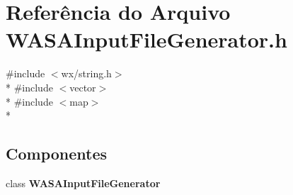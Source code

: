 \section{Referência do Arquivo W\+A\+S\+A\+Input\+File\+Generator.\+h}
\label{_w_a_s_a_input_file_generator_8h}
{\ttfamily \#include $<$wx/string.\+h$>$}\\*
{\ttfamily \#include $<$vector$>$}\\*
{\ttfamily \#include $<$map$>$}\\*
\subsection*{Componentes}
\begin{DoxyCompactItemize}
\item 
class {\bf W\+A\+S\+A\+Input\+File\+Generator}
\end{DoxyCompactItemize}
